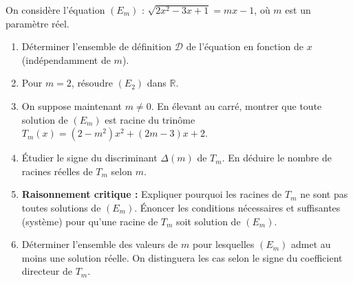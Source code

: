 \documentclass[11pt]{article}
\begin{document}
\begin{exercice}
On considère l'équation $(E_m)$ : $\sqrt{2x^2-3x+1} = mx-1$, où $m$ est un paramètre réel.
\begin{enumerate}
    \item Déterminer l'ensemble de définition $\mathcal{D}$ de l'équation en fonction de $x$ (indépendamment de $m$).
    \item Pour $m=2$, résoudre $(E_2)$ dans $\mathbb{R}$.
    \item On suppose maintenant $m \neq 0$. En élevant au carré, montrer que toute solution de $(E_m)$ est racine du trinôme $T_m(x) = (2-m^2)x^2 + (2m-3)x + 2$.
    \item Étudier le signe du discriminant $\Delta(m)$ de $T_m$. En déduire le nombre de racines réelles de $T_m$ selon $m$.
    \item \textbf{Raisonnement critique :} Expliquer pourquoi les racines de $T_m$ ne sont pas toutes solutions de $(E_m)$. Énoncer les conditions nécessaires et suffisantes (système) pour qu'une racine de $T_m$ soit solution de $(E_m)$.
    \item Déterminer l'ensemble des valeurs de $m$ pour lesquelles $(E_m)$ admet au moins une solution réelle. On distinguera les cas selon le signe du coefficient directeur de $T_m$.
\end{enumerate}
\end{exercice}
\end{document}
